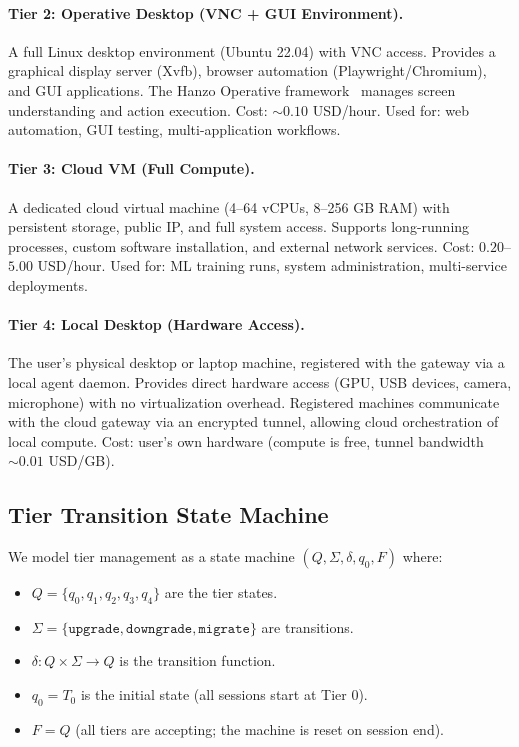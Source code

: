 \paragraph{Tier 2: Operative Desktop (VNC + GUI Environment).}
A full Linux desktop environment (Ubuntu 22.04) with VNC access. Provides
a graphical display server (Xvfb), browser automation (Playwright/Chromium),
and GUI applications. The Hanzo Operative framework~\cite{hanzo2024operative}
manages screen understanding and action execution. Cost: $\sim 0.10$ USD/hour.
Used for: web automation, GUI testing, multi-application workflows.

\paragraph{Tier 3: Cloud VM (Full Compute).}
A dedicated cloud virtual machine (4--64 vCPUs, 8--256 GB RAM) with
persistent storage, public IP, and full system access. Supports long-running
processes, custom software installation, and external network services. Cost:
$0.20$--$5.00$ USD/hour. Used for: ML training runs, system administration,
multi-service deployments.

\paragraph{Tier 4: Local Desktop (Hardware Access).}
The user's physical desktop or laptop machine, registered with the gateway
via a local agent daemon. Provides direct hardware access (GPU, USB devices,
camera, microphone) with no virtualization overhead. Registered machines
communicate with the cloud gateway via an encrypted tunnel, allowing cloud
orchestration of local compute. Cost: user's own hardware (compute is free,
tunnel bandwidth $\sim 0.01$ USD/GB).

\subsection{Tier Transition State Machine}

We model tier management as a state machine $(Q, \Sigma, \delta, q_0, F)$
where:
\begin{itemize}[leftmargin=1.5em]
    \item $Q = \{q_0, q_1, q_2, q_3, q_4\}$ are the tier states.
    \item $\Sigma = \{\texttt{upgrade}, \texttt{downgrade}, \texttt{migrate}\}$
          are transitions.
    \item $\delta : Q \times \Sigma \to Q$ is the transition function.
    \item $q_0 = T_0$ is the initial state (all sessions start at Tier 0).
    \item $F = Q$ (all tiers are accepting; the machine is reset on session end).
\end{itemize}

